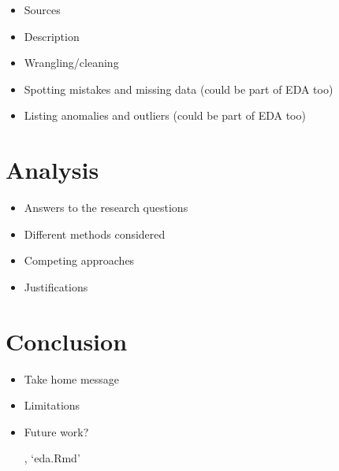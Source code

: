 \documentclass[
]{article}
\providecommand{\tightlist}{%
  \setlength{\itemsep}{0pt}\setlength{\parskip}{0pt}}
\begin{document}
\begin{itemize}
\tightlist
\item
  Sources
\item
  Description
\item
  Wrangling/cleaning
\item
  Spotting mistakes and missing data (could be part of EDA too)
\item
  Listing anomalies and outliers (could be part of EDA too)
\end{itemize}

\hypertarget{analysis}{%
\section{Analysis}\label{analysis}}

\begin{itemize}
\tightlist
\item
  Answers to the research questions
\item
  Different methods considered
\item
  Competing approaches
\item
  Justifications
\end{itemize}

\hypertarget{conclusion}{%
\section{Conclusion}\label{conclusion}}

\begin{itemize}
\item
  Take home message
\item
  Limitations
\item
  Future work?

  , `eda.Rmd'
\end{itemize}
\end{document}
